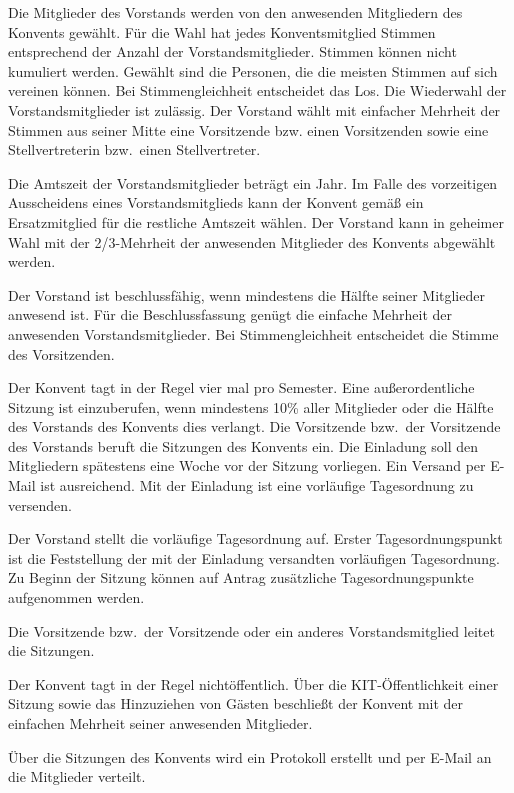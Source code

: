 \documentclass[a4paper, parskip=half, numbers=noenddot]{scrartcl}
\begin{document}
\begin{contract}
Die Mitglieder des Vorstands werden von den anwesenden Mitgliedern des Konvents gewählt. Für
die Wahl hat jedes Konventsmitglied Stimmen entsprechend der Anzahl der Vorstandsmitglieder. Stimmen können nicht kumuliert werden.
Gewählt sind die Personen, die die meisten Stimmen auf sich vereinen können. Bei Stimmengleichheit entscheidet das Los. Die Wiederwahl der Vorstandsmitglieder ist zulässig.
Der Vorstand wählt mit einfacher Mehrheit der Stimmen aus seiner Mitte eine Vorsitzende bzw.
einen Vorsitzenden sowie eine Stellvertreterin bzw.\ einen Stellvertreter.
\label{wahl}

Die Amtszeit der Vorstandsmitglieder beträgt ein Jahr. Im Falle des vorzeitigen Ausscheidens
eines Vorstandsmitglieds kann der Konvent gemäß  ein Ersatzmitglied für die restliche Amtszeit wählen. Der Vorstand kann in geheimer Wahl mit der 2/3-Mehrheit der anwesenden Mitglieder des Konvents abgewählt werden.

Der Vorstand ist beschlussfähig, wenn mindestens die Hälfte seiner Mitglieder anwesend ist. Für die Beschlussfassung genügt die einfache Mehrheit der anwesenden Vorstandsmitglieder. Bei Stimmengleichheit entscheidet die Stimme des Vorsitzenden.


Der Konvent tagt in der Regel vier mal pro Semester. 
Eine außerordentliche Sitzung ist einzuberufen, wenn mindestens 10\% aller Mitglieder oder die Hälfte des Vorstands des Konvents dies verlangt.
Die Vorsitzende bzw.\ der Vorsitzende des Vorstands beruft die Sitzungen des Konvents ein.
Die Einladung soll den Mitgliedern spätestens eine Woche vor der Sitzung vorliegen. Ein Versand per E-Mail ist ausreichend. Mit der Einladung ist eine vorläufige Tagesordnung zu versenden.

Der Vorstand stellt die vorläufige Tagesordnung auf. Erster Tagesordnungspunkt ist die Feststellung der mit der Einladung versandten vorläufigen Tagesordnung. Zu Beginn der Sitzung können auf Antrag zusätzliche Tagesordnungspunkte aufgenommen werden.

Die Vorsitzende bzw.\ der Vorsitzende oder ein anderes Vorstandsmitglied leitet die Sitzungen.	

Der Konvent tagt in der Regel nichtöffentlich. Über die KIT-Öffentlichkeit einer Sitzung sowie das Hinzuziehen von Gästen beschließt der Konvent mit der einfachen Mehrheit seiner anwesenden Mitglieder.

Über die Sitzungen des Konvents wird ein Protokoll erstellt und per E-Mail an die Mitglieder verteilt.


\end{contract}
\end{document}
